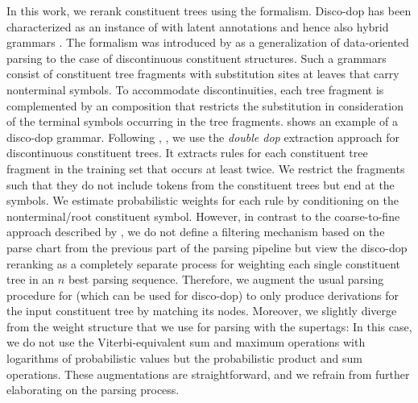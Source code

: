 \documentclass[../../document.tex]{subfiles}
\begin{document}
    In this work, we rerank constituent trees using the  formalism.
    Disco-dop has been characterized as an instance of  with latent annotations \citep[Section~4]{Cra11} and hence also hybrid grammars \citep[Section~8.5.1]{Geb20}.
    The formalism was introduced by \citet{Cra11} as a generalization of data-oriented parsing \citep{Bod92} to the case of discontinuous constituent structures.
    Such a grammars consist of constituent tree fragments with substitution sites at leaves that carry nonterminal symbols.
    To accommodate discontinuities, each tree fragment is complemented by an  composition that restricts the substitution in consideration of the terminal symbols occurring in the tree fragments.
     shows an example of a disco-dop grammar.
    Following \citet{San11}, \citet{Cra11}, we use the \emph{double dop} extraction approach for discontinuous constituent trees.
    It extracts rules for each constituent tree fragment in the training set that occurs at least twice.
    We restrict the fragments such that they do not include tokens from the constituent trees but end at the  symbols.
    We estimate probabilistic weights for each rule by conditioning on the  nonterminal/root constituent symbol.
    However, in contrast to the coarse-to-fine approach described by \citet{Cra11}, we do not define a filtering mechanism based on the parse chart from the previous part of the parsing pipeline but view the disco-dop reranking as a completely separate process for weighting each single constituent tree in an \(n\) best parsing sequence.
    Therefore, we augment the usual parsing procedure for  (which can be used for disco-dop) to only produce derivations for the input constituent tree by matching its nodes.
    Moreover, we slightly diverge from the weight structure that we use for parsing with the supertags:
        In this case, we do not use the Viterbi-equivalent sum and maximum operations with logarithms of probabilistic values but the probabilistic product and sum operations.
    These augmentations are straightforward, and we refrain from further elaborating on the parsing process.
\end{document}
